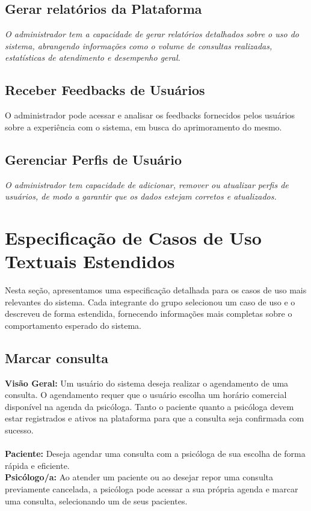 \documentclass[a4paper,12pt]{report}
\begin{document}
\subsection{Gerar relatórios da Plataforma}

\textit{O administrador tem a capacidade de gerar relatórios detalhados sobre o uso do sistema, abrangendo informações como o volume de consultas realizadas, estatísticas de atendimento e desempenho geral. 
}

\subsection{Receber Feedbacks de Usuários}
O administrador pode acessar e analisar os feedbacks fornecidos pelos usuários sobre a
experiência com o sistema, em busca do aprimoramento do mesmo.

\subsection{Gerenciar Perfis de Usuário}

\textit{O administrador tem capacidade de adicionar, remover ou atualizar perfis de usuários, de modo a garantir que os dados estejam corretos e atualizados.  
}

\section{Especificação de Casos de Uso Textuais Estendidos}

Nesta seção, apresentamos uma especificação detalhada para os casos de uso mais relevantes do sistema. Cada integrante do grupo selecionou um caso de uso e o descreveu de forma estendida, fornecendo informações mais completas sobre o comportamento esperado do sistema.

\subsection{Marcar consulta}
\textbf{Visão Geral:} Um usuário do sistema deseja realizar o agendamento de uma consulta. O agendamento requer que o usuário escolha um horário comercial disponível na agenda da psicóloga. Tanto o paciente quanto a psicóloga devem estar registrados e ativos na plataforma para que a consulta seja confirmada com sucesso.
\\
\\
\textbf{Paciente:} Deseja agendar uma consulta com a psicóloga de sua escolha de forma rápida e eficiente.
\\
\textbf{Psicólogo/a:}  Ao atender um paciente ou ao desejar repor uma consulta previamente cancelada, a psicóloga pode acessar a sua própria agenda e marcar uma consulta, selecionando um de seus pacientes.
\\
\end{document}
